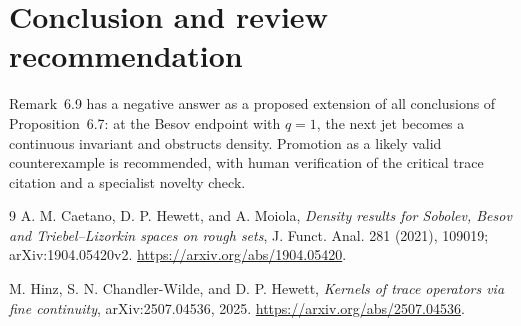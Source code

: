 \documentclass[11pt]{article}
\begin{document}
\section{Conclusion and review recommendation}

Remark~6.9 has a negative answer as a proposed extension of all conclusions
of Proposition~6.7: at the Besov endpoint with $q=1$, the next jet becomes a
continuous invariant and obstructs density.  Promotion as a likely valid
counterexample is recommended, with human verification of the critical trace
citation and a specialist novelty check.

\begin{thebibliography}{9}
A. M. Caetano, D. P. Hewett, and A. Moiola,
\emph{Density results for Sobolev, Besov and Triebel--Lizorkin spaces on rough sets},
J. Funct. Anal. 281 (2021), 109019; arXiv:1904.05420v2.
\url{https://arxiv.org/abs/1904.05420}.

M. Hinz, S. N. Chandler-Wilde, and D. P. Hewett,
\emph{Kernels of trace operators via fine continuity},
arXiv:2507.04536, 2025.
\url{https://arxiv.org/abs/2507.04536}.
\end{thebibliography}
\end{document}
